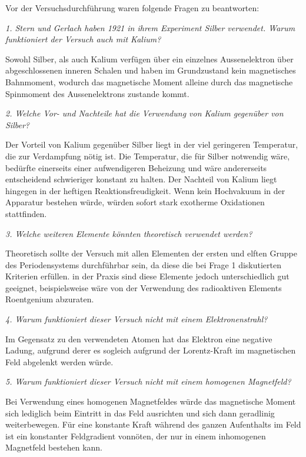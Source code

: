 \documentclass[a4paper,parskip,11pt, DIV12]{scrreprt}
\begin{document}
 Vor der Versuchsdurchführung waren folgende Fragen zu beantworten:
 
 \textit{1. Stern und Gerlach haben 1921 in ihrem Experiment Silber verwendet. Warum funktioniert der
Versuch auch mit Kalium?}

Sowohl Silber, als auch Kalium verfügen über ein einzelnes Aussenelektron über abgeschlossenen inneren Schalen und haben im Grundzustand kein magnetisches Bahnmoment, wodurch das magnetische Moment alleine durch das magnetische Spinmoment des Aussenelektrons zustande kommt.

\textit{2. Welche Vor- und Nachteile hat die Verwendung von Kalium gegenüber von Silber?}

Der Vorteil von Kalium gegenüber Silber liegt in der viel geringeren Temperatur, die zur Verdampfung nötig ist. Die Temperatur, die für Silber notwendig wäre, bedürfte einerseits einer aufwendigeren Beheizung und wäre andererseits entscheidend schwieriger konstant zu halten. Der Nachteil von Kalium liegt hingegen in der heftigen Reaktionsfreudigkeit. Wenn kein Hochvakuum in der Apparatur bestehen würde, würden sofort stark exotherme Oxidationen stattfinden.

\textit{3. Welche weiteren Elemente könnten theoretisch verwendet werden?}

Theoretisch sollte der Versuch mit allen Elementen der ersten und elften Gruppe des Periodensystems durchführbar sein, da diese die bei Frage 1 diskutierten Kriterien erfüllen. in der Praxis sind diese Elemente jedoch unterschiedlich gut geeignet, beispielsweise wäre von der Verwendung des radioaktiven Elements Roentgenium abzuraten.

\textit{4. Warum funktioniert dieser Versuch nicht mit einem Elektronenstrahl?}

Im Gegensatz zu den verwendeten Atomen hat das Elektron eine negative Ladung, aufgrund derer es sogleich aufgrund der Lorentz-Kraft im magnetischen Feld abgelenkt werden würde.

\textit{5. Warum funktioniert dieser Versuch nicht mit einem homogenen Magnetfeld?}

Bei Verwendung eines homogenen Magnetfeldes würde das magnetische Moment sich lediglich beim Eintritt in das Feld ausrichten und sich dann geradlinig weiterbewegen. Für eine konstante Kraft während des ganzen Aufenthalts im Feld ist ein konstanter Feldgradient vonnöten, der nur in einem inhomogenen Magnetfeld bestehen kann.
\end{document}
